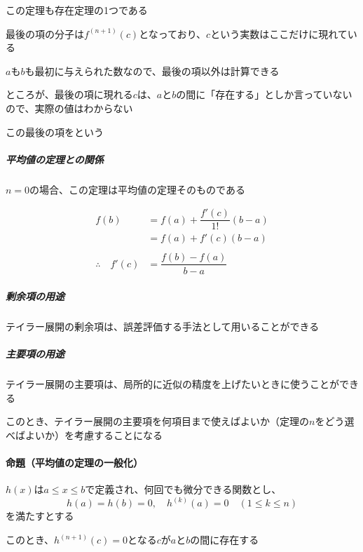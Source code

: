 \documentclass[../book_jiriki_calc]{subfiles}
\begin{document}
\sectionline

この定理も存在定理の1つである

最後の項の分子は$f^{(n+1)}(c)$となっており、$c$という実数はここだけに現れている

$a$も$b$も最初に与えられた数なので、最後の項以外は計算できる

ところが、最後の項に現れる$c$は、$a$と$b$の間に「存在する」としか言っていないので、実際の値はわからない

この最後の項をという

\sectionline

\subparagraph{平均値の定理との関係}

$n=0$の場合、この定理は平均値の定理そのものである

\begin{align*}
  f(b)                   & = f(a) + \dfrac{f'(c)}{1!}(b-a) \\
                         & = f(a) + f'(c)(b-a)             \\\\
  \therefore \quad f'(c) & = \dfrac{f(b) - f(a)}{b-a}
\end{align*}

\sectionline

\subparagraph{剰余項の用途}

テイラー展開の剰余項は、誤差評価する手法として用いることができる

\sectionline

\subparagraph{主要項の用途}

テイラー展開の主要項は、局所的に近似の精度を上げたいときに使うことができる

このとき、テイラー展開の主要項を何項目まで使えばよいか（定理の$n$をどう選べばよいか）を考慮することになる

\sectionline

\paragraph{命題（平均値の定理の一般化）}

$h(x)$は$a \leq x \leq b$で定義され、何回でも微分できる関数とし、
\begin{equation*}
  h(a) = h(b) = 0,\quad h^{(k)}(a) = 0 \quad (1 \leq k \leq n)
\end{equation*}
を満たすとする

このとき、$h^{(n+1)}(c) = 0$となる$c$が$a$と$b$の間に存在する

\sectionline
\end{document}
